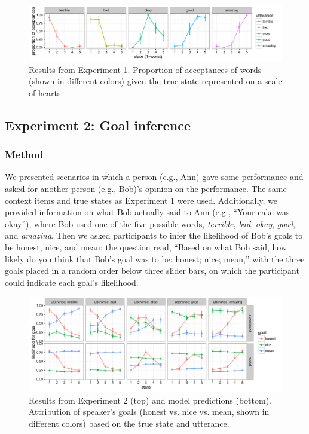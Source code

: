 \documentclass[10pt,letterpaper]{article}
\begin{document}
\begin{figure}[t]
\begin{center} 
  \includegraphics[width=.9\textwidth]{figures/exp1.pdf}
  \caption{\label{fig:exp1} Results from Experiment 1. Proportion of acceptances of words (shown in different colors) given the true state represented on a scale of hearts.}
  \end{center} 
\end{figure}

\subsection{Experiment 2: Goal inference}

\subsubsection{Method} 

We presented scenarios in which a person (e.g., Ann) gave some performance and asked for another person (e.g., Bob)'s opinion on the performance. The same context items and true states as Experiment 1 were used. Additionally, we provided information on what Bob actually said to Ann (e.g., ``Your cake was okay''), where Bob used one of the five possible words,  \emph{terrible}, \emph{bad}, \emph{okay}, \emph{good}, and \emph{amazing}. Then we asked participants to infer the likelihood of Bob's goals to be honest, nice, and mean: the question read, ``Based on what Bob said, how likely do you think that Bob's goal was to be: honest; nice; mean,'' with the three goals placed in a random order below three slider bars, on which the participant could indicate each goal's likelihood.

\begin{figure}[t]
\begin{center} 
  \includegraphics[width=.9\textwidth]{figures/exp2.pdf}
  \caption{\label{fig:exp2} Results from Experiment 2 (top) and model predictions (bottom). Attribution of speaker's goals (honest vs. nice vs. mean, shown in different colors) based on the true state and utterance.}
  \end{center} 
\end{figure}
\end{document}
